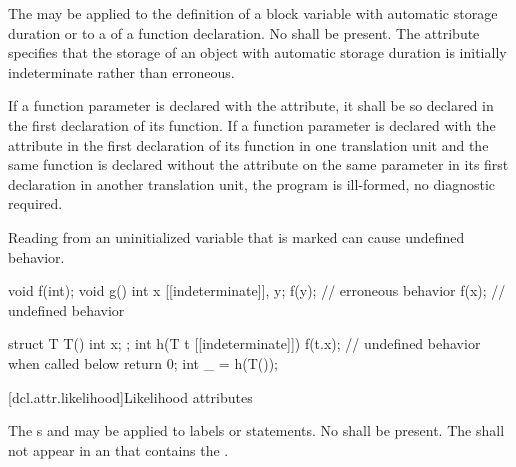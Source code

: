 \pnum
The   may be applied
to the definition of a block variable with automatic storage duration or
to a  of a function declaration.
No  shall be present.
The attribute specifies
that the storage of an object with automatic storage duration
is initially indeterminate rather than erroneous.

\pnum
If a function parameter is declared with the  attribute,
it shall be so declared in the first declaration of its function.
If a function parameter is declared with
the  attribute in the first declaration of its function
in one translation unit and
the same function is declared without the  attribute
on the same parameter in its first declaration in another translation unit,
the program is ill-formed, no diagnostic required.

\pnum
\begin{note}
Reading from an uninitialized variable
that is marked \tcode{[[indeterminate]]} can cause undefined behavior.
\begin{codeblock}
void f(int);
void g() {
  int x [[indeterminate]], y;
  f(y);                 // erroneous behavior
  f(x);                 // undefined behavior
}

struct T {
  T() {}
  int x;
};
int h(T t [[indeterminate]]) {
  f(t.x);               // undefined behavior when called below
  return 0;
}
int _ = h(T());
\end{codeblock}
\end{note}

[dcl.attr.likelihood]{Likelihood attributes}%

\pnum
The s
 and 
may be applied to labels or statements.
No  shall be present.
The  
shall not appear in an 
that contains the  .

